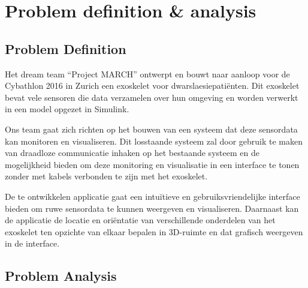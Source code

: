 \section{Problem definition \& analysis}
\subsection{Problem Definition}
Het dream team ``Project MARCH'' ontwerpt en bouwt naar aanloop voor de Cybathlon 2016 in Zurich een exoskelet voor dwarslaesiepatiënten. Dit exoskelet bevat vele sensoren die data verzamelen over hun omgeving en worden verwerkt in een model opgezet in Simulink.

Ons team gaat zich richten op het bouwen van een systeem dat deze sensordata kan monitoren en visualiseren. Dit losstaande systeem zal door gebruik te maken van draadloze communicatie inhaken op het bestaande systeem en de mogelijkheid bieden om deze monitoring en visualisatie in een interface te tonen zonder met kabels verbonden te zijn met het exoskelet.

De te ontwikkelen applicatie gaat een intuïtieve en gebruiksvriendelijke interface bieden om ruwe sensordata te kunnen weergeven en visualiseren. Daarnaast kan de applicatie de locatie en oriëntatie van verschillende onderdelen van het exoskelet ten opzichte van elkaar bepalen in 3D-ruimte en dat grafisch weergeven in de interface.

\subsection{Problem Analysis}